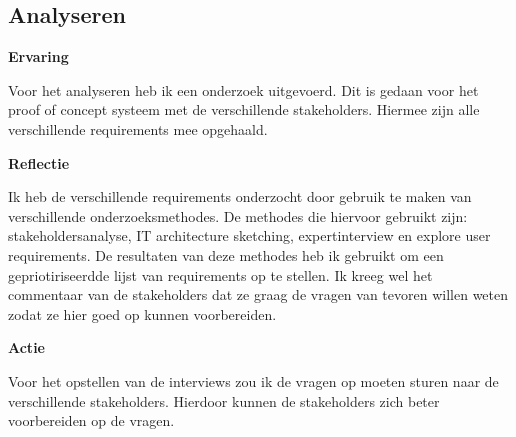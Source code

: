 \subsection{Analyseren}

\textbf{Ervaring}

\whitespace
Voor het analyseren heb ik een onderzoek uitgevoerd.
Dit is gedaan voor het proof of concept systeem met de verschillende stakeholders.
Hiermee zijn alle verschillende requirements mee opgehaald.

\whitespace
\textbf{Reflectie}

\whitespace
Ik heb de verschillende requirements onderzocht door gebruik te maken van verschillende onderzoeksmethodes.
De methodes die hiervoor gebruikt zijn: stakeholdersanalyse, IT architecture sketching, expertinterview en explore user requirements.
De resultaten van deze methodes heb ik gebruikt om een gepriotiriseerdde lijst van requirements op te stellen.
Ik kreeg wel het commentaar van de stakeholders dat ze graag de vragen van tevoren willen weten zodat ze hier goed op kunnen voorbereiden.

\whitespace
\textbf{Actie}

\whitespace
Voor het opstellen van de interviews zou ik de vragen op moeten sturen naar de verschillende stakeholders.
Hierdoor kunnen de stakeholders zich beter voorbereiden op de vragen.
